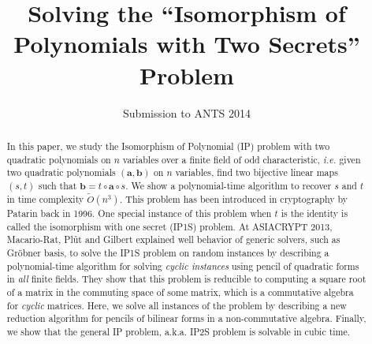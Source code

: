 \documentclass{lms}%
\begin{document}
\title[Solving ``Isomorphism of Polynomials with Two Secrets'']%
{Solving the ``Isomorphism of Polynomials with Two Secrets'' Problem}%
\author{Submission to ANTS 2014}
\maketitle

\begin{abstract}
In this paper, we study the Isomorphism of Polynomial (IP) problem with two
quadratic polynomials on $n$ variables over a finite field of odd
characteristic, \textit{i.e.} given two quadratic polynomials $(\bm{a},\bm{b})$ 
on $n$ variables, find two bijective linear maps $(s,t)$ such that 
$\bm{b}=t\circ \bm{a}\circ s$. We show a
polynomial-time algorithm to recover $s$ and $t$ in time complexity $\widetilde{O}(n^3)$.
This problem has been introduced in cryptography by Patarin back in 1996.
One special instance of this problem when $t$ is the identity is called
the isomorphism with one secret (IP1S) problem. At ASIACRYPT 2013, Macario-Rat, Pl\^ut and Gilbert
explained well behavior of generic solvers, such as Gr\"obner basis, to
solve the IP1S problem on random instances by describing a polynomial-time
algorithm for solving \textit{cyclic instances} using pencil of quadratic forms 
in \textit{all} finite fields. They show that this problem is
reducible to computing a square root of a matrix in the commuting space of 
some matrix, which is a commutative algebra for \textit{cyclic} matrices. Here, we solve all
instances of the problem by describing a new reduction algorithm for
pencils of bilinear forms in a non-commutative algebra. Finally, we show
that the general IP problem, a.k.a. IP2S problem is solvable in cubic
time.
\end{abstract}
\end{document}
